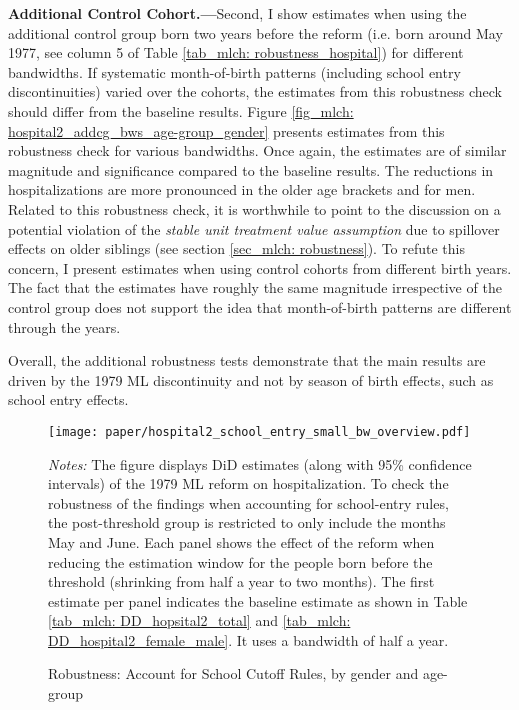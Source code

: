 \textbf{Additional Control Cohort.---}Second, I show estimates when using the additional control group born two years before the reform (i.e. born around May 1977, see column 5 of Table \ref{tab_mlch: robustness_hospital}) for different bandwidths. If systematic month-of-birth patterns (including school entry discontinuities) varied over the cohorts, the estimates from this robustness check should differ from the baseline results. Figure \ref{fig_mlch: hospital2_addcg_bws_age-group_gender} presents estimates from this robustness check for various bandwidths. Once again, the estimates are of similar magnitude and significance compared to the baseline results. The reductions in hospitalizations are more pronounced in the older age brackets and for men. Related to this robustness check, it is worthwhile to point to the discussion on a potential violation of the \textit{stable unit treatment value assumption} due to spillover effects on older siblings (see section \ref{sec_mlch: robustness}). To refute this concern, I present estimates when using control cohorts from different birth years. The fact that the estimates have roughly the same magnitude irrespective of the control group does not support the idea that month-of-birth patterns are different through the years.

Overall, the additional robustness tests demonstrate that the main results are driven by the 1979 ML discontinuity and not by season of birth effects, such as school entry effects.




 




\begin{landscape}
	\vspace*{\fill}
	\begin{figure}[H]\centering
		\caption{Robustness: Account for School Cutoff Rules, by gender and age-group}\label{fig_mlch: hospital2_school_cutoff}
		\texttt{[image: paper/hospital2\_school\_entry\_small\_bw\_overview.pdf]}
		\scriptsize
		\begin{minipage}{0.95\linewidth}
			\emph{Notes:} The figure displays DiD estimates (along with 95\% confidence intervals) of the 1979 ML reform on hospitalization. To check the robustness of the findings when accounting for school-entry rules, the post-threshold group is restricted to only include the months May and June. Each panel shows the effect of the reform when reducing the estimation window for the people born before the threshold (shrinking from half a year to two months). The first estimate per panel indicates the baseline estimate as shown in Table \ref{tab_mlch: DD_hopsital2_total} and \ref{tab_mlch: DD_hospital2_female_male}. It uses a bandwidth of half a year.
		\end{minipage}
	\end{figure}
	\vspace*{\fill}\clearpage
\end{landscape}
\restoregeometry 




